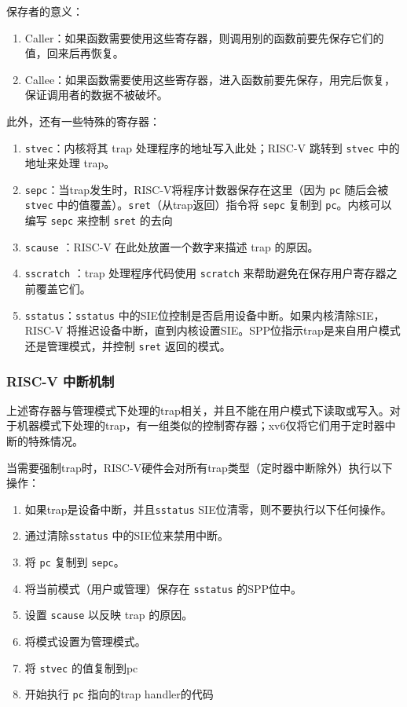 保存者的意义：

\begin{enumerate}
	\item Caller：如果函数需要使用这些寄存器，则调用别的函数前要先保存它们的值，回来后再恢复。
	\item Callee：如果函数需要使用这些寄存器，进入函数前要先保存，用完后恢复，保证调用者的数据不被破坏。
\end{enumerate}

此外，还有一些特殊的寄存器：

\begin{enumerate}
	\item \texttt{stvec}：内核将其 trap 处理程序的地址写入此处；RISC-V 跳转到 \texttt{stvec} 中的地址来处理 trap。
	\item \texttt{sepc}：当trap发生时，RISC-V将程序计数器保存在这里（因为 \texttt{pc} 随后会被 \texttt{stvec} 中的值覆盖）。\texttt{sret}（从trap返回）指令将 \texttt{sepc} 复制到 \texttt{pc}。内核可以编写 \texttt{sepc} 来控制 \texttt{sret} 的去向
	\item \texttt{scause} ：RISC-V 在此处放置一个数字来描述 trap 的原因。
	\item \texttt{sscratch} ：trap 处理程序代码使用 \texttt{scratch} 来帮助避免在保存用户寄存器之前覆盖它们。
	\item \texttt{sstatus}：\texttt{sstatus} 中的SIE位控制是否启用设备中断。如果内核清除SIE，RISC-V 将推迟设备中断，直到内核设置SIE。SPP位指示trap是来自用户模式还是管理模式，并控制 \texttt{sret} 返回的模式。
\end{enumerate}

\subsubsection{RISC-V 中断机制}

上述寄存器与管理模式下处理的trap相关，并且不能在用户模式下读取或写入。对于机器模式下处理的trap，有一组类似的控制寄存器；xv6仅将它们用于定时器中断的特殊情况。

当需要强制trap时，RISC-V硬件会对所有trap类型（定时器中断除外）执行以下操作：

\begin{enumerate}
	\item 如果trap是设备中断，并且\texttt{sstatus} SIE位清零，则不要执行以下任何操作。
	\item 通过清除\texttt{sstatus} 中的SIE位来禁用中断。
	\item 将 \texttt{pc} 复制到 \texttt{sepc}。
	\item 将当前模式（用户或管理）保存在 \texttt{sstatus} 的SPP位中。
	\item 设置 \texttt{scause} 以反映 trap 的原因。
	\item 将模式设置为管理模式。
	\item 将 \texttt{stvec} 的值复制到pc
	\item 开始执行 \texttt{pc} 指向的trap handler的代码
\end{enumerate}

